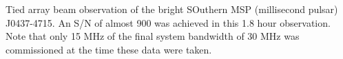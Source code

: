 
  Tied array beam observation of the bright SOuthern MSP (millisecond pulsar) J0437-4715. An S/N of almost 900 was achieved in this 1.8 hour observation. Note that only 15 MHz of the final system bandwidth of 30 MHz was commissioned at the time these data were taken.  